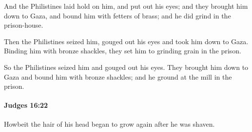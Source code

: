 			\begin{versebox}
					\item[BHS] 
					\item[ASV] And the Philistines laid hold on him, and put out his eyes; and they brought him down to Gaza, and bound him with fetters of brass; and he did grind in the prison-house.
					\item[NIV] Then the Philistines seized him, gouged out his eyes and took him down to Gaza. Binding him with bronze shackles, they set him to grinding grain in the prison.
					\item[NRSV] So the Philistines seized him and gouged out his eyes. They brought him down to Gaza and bound him with bronze shackles; and he ground at the mill in the prison.
			\end{versebox}

		\paragraph{Judges 16:22} %
			\label{JUDGES-16-22}

			Howbeit the hair of his head began to grow again after he was shaven.

